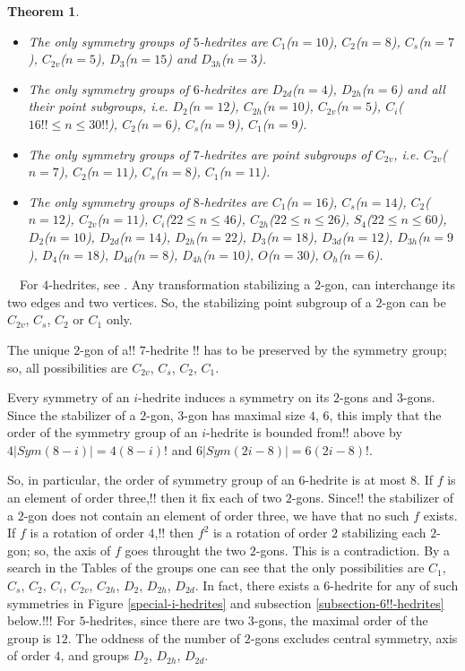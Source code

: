 \documentclass[12pt]{article}
\newtheorem{theorem}{Theorem}
\newcommand{\proof}{\noindent{\bf Proof.}\ \ }
\begin{document}
\begin{remark!!}
\begin{theorem}
\begin{itemize}
\item[(ii)] The only symmetry groups of $5$-hedrites are $C_1$($n=10$), $C_2$($n=8$), $C_s$($n=7$), $C_{2v}$($n=5$), $D_3$($n=15$) and $D_{3h}$($n=3$).

\item[(iii)] The only symmetry groups of $6$-hedrites are $D_{2d}$($n=4$), $D_{2h}$($n=6$) and all their point subgroups, i.e. $D_{2}$($n=12$), $C_{2h}$($n=10$), $C_{2v}$($n=5$), $C_i$($16!!\le n\le 30!!$), $C_{2}$($n=6$), $C_{s}$($n=9$), $C_{1}$($n=9$).

\item[(iv)] The only symmetry groups of $7$-hedrites are point subgroups of $C_{2v}$, i.e. $C_{2v}$($n=7$), $C_{2}$($n=11$), $C_{s}$($n=8$), $C_{1}$($n=11$).

\item[(v)] The only symmetry groups of $8$-hedrites are $C_{1}$($n=16$), $C_s$($n=14$), $C_2$($n=12$), $C_{2v}$($n=11$), $C_i$($22\leq n\leq 46$), $C_{2h}$($22\leq n \leq 26$), $S_4$($22\leq n\leq 60$), $D_2$($n=10$), $D_{2d}$($n=14$), $D_{2h}$($n=22$), $D_3$($n=18$), $D_{3d}$($n=12$), $D_{3h}$($n=9$), $D_4$($n=18$), $D_{4d}$($n=8$), $D_{4h}$($n=10$), $O$($n=30$), $O_h$($n=6$).

\end{itemize}


\end{theorem}
\proof For $4$-hedrites, see \cite{DSt}. Any transformation
stabilizing a $2$-gon, can interchange its two edges and two vertices. So, the stabilizing point subgroup of a $2$-gon can be $C_{2v}$, $C_s$, $C_2$ or $C_1$ only.

The unique $2$-gon of a!! $7$-hedrite !! has to be preserved by the symmetry group; so, all possibilities are $C_{2v}$, $C_s$, $C_2$, $C_1$.

Every symmetry of an $i$-hedrite induces a symmetry on its $2$-gons and $3$-gons. Since the stabilizer of a $2$-gon, $3$-gon has maximal size $4$, $6$, this imply that the order of the symmetry group of an $i$-hedrite is 
bounded from!! above by $4|Sym(8-i)|=4(8-i)!$ and $6|Sym(2i-8)|=6(2i-8)!$.

So, in particular, the order of symmetry group of an $6$-hedrite is at most $8$. If $f$ is an element of order three,!! then it fix each 
of two $2$-gons. Since!! the stabilizer of a $2$-gon does not contain an element of order three, we have that no such $f$ exists. If $f$ is 
a rotation of order $4$,!! then $f^2$ is a rotation of order $2$ stabilizing each $2$-gon; so, the axis of $f$ goes throught the two $2$-gons. This is a contradiction.
By a search in the Tables of the groups one can see that the only possibilities are $C_1$, $C_s$, $C_2$, $C_i$, $C_{2v}$, $C_{2h}$, $D_2$, $D_{2h}$, $D_{2d}$. In fact, there exists a $6$-hedrite for any of such symmetries in Figure \ref{special-i-hedrites} and subsection \ref{subsection-6!!-hedrites} 
below.!!!
For $5$-hedrites, since there are two $3$-gons, the maximal order of the group is $12$. The oddness of the number of $2$-gons excludes central symmetry, axis of order $4$, and groups $D_2$, $D_{2h}$, $D_{2d}$.


\end{remark!!}
\end{document}

